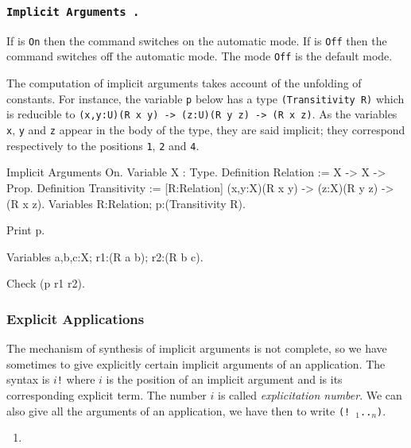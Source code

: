 \subsubsection{\tt Implicit Arguments {\switch}.}
\label{Implicit Arguments}

If {\switch} is {\tt On} then the command switches on the automatic
mode. If {\switch} is {\tt Off} then the command switches off the
automatic mode. The mode {\tt Off} is the default mode.

The computation of implicit arguments takes account of the
unfolding of constants.  For instance, the variable {\tt p} below has
a type {\tt (Transitivity R)} which is reducible to {\tt (x,y:U)(R x
y) -> (z:U)(R y z) -> (R x z)}. As the variables {\tt x}, {\tt y} and
{\tt z} appear in the body of the type, they are said implicit; they
correspond respectively to the positions {\tt 1}, {\tt 2} and {\tt 4}.

\begin{coq_example*}
Implicit Arguments On.
Variable X : Type.
Definition Relation := X -> X -> Prop.
Definition Transitivity := [R:Relation]
           (x,y:X)(R x y) -> (z:X)(R y z) -> (R x z).
Variables R:Relation; p:(Transitivity R).
\end{coq_example*}
\begin{coq_example}
Print p.
\end{coq_example}
\begin{coq_example*}
Variables a,b,c:X;  r1:(R a b); r2:(R b c).
\end{coq_example*}
\begin{coq_example}
Check (p r1 r2).
\end{coq_example}

\subsubsection{Explicit Applications}

The mechanism of synthesis of implicit arguments is not complete, so
we have sometimes to give explicitly certain implicit arguments of an
application. The syntax is {\tt $i$!}{\term} where $i$ is the position
of an implicit argument and {\term} is its corresponding explicit
term. The number $i$ is called {\em explicitation number}.  We can
also give all the arguments of an application, we have then to write
{\tt (!{\ident}~{\term}$_1$..{\term}$_n$)}.

\ErrMsg
\begin{enumerate}
\item {}
\end{enumerate}

